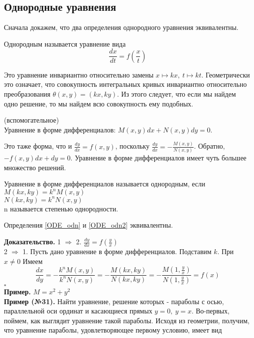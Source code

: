 \subsection{Однородные уравнения}
Сначала докажем, что два определения однородного уравнения эквивалентны.
\begin{defin}
Однородным называется уравнение вида
\begin{equation}%
    \frac{dx}{dt}=f\left(\frac{x}{t}\right) \label{ODE_odn}
\end{equation} 
\end{defin}
Это уравнение инвариантно относительно замены $x\mapsto kx,~t\mapsto kt$.
Геометрически это означает, что совокупность интегральных кривых инвариантно
относительно преобразования $\theta(x,y)=(kx,ky)$.
Из этого следует, что если мы найдем одно решение, то мы найдем всю 
совокупность ему подобных. %
\begin{defin}
    (вспомогательное)\\
Уравнение в форме дифференциалов:
    $M(x,y)dx+N(x,y)dy=0$.  
\end{defin}
Это таже форма, что и $\frac{dy}{dx}=f(x,y)$, поскольку 
$\frac{dy}{dx}=-\frac{M(x,y)}{N(x,y)}$. Обратно, $-f(x,y)dx+dy=0$.
Уравнение в форме дифференциалов имеет чуть большее множество решений. 
\begin{defin}\label{ODE_odn2}
Уравнение в форме дифференциалов называется однородным, если\\
$M(kx,ky)=k^nM(x,y)$\\ 
$N(kx,ky)=k^nN(x,y)$\\
n называется степенью однородности.
\end{defin}
\begin{theor}
    Определения \ref{ODE_odn} и \ref{ODE_odn2} эквивалентны. 
\end{theor}
\textbf{Доказательство.} 1 $\Rightarrow$ 2. $\frac{dy}{dx}=f(\frac{y}{x})$\\
2 $\Rightarrow$ 1. Пусть дано уравнение в форме дифференциалов. Подставим $k$.
При $x\ne 0$ Имеем $$\frac{dx}{dy}=-\frac{k^nM(x,y)}{k^nN(x,y)}=
-\frac{M(kx,ky)}{N(kx,ky)}=-\frac{M(1,\frac{y}{x})}{N(1,\frac{y}{x})}=f(x)$$
$\square$ \\
\textbf{Пример.} $M=x^2+y^2$\\
\textbf{Пример (№31).} Найти уравнение, решение которых - параболы с осью, 
параллельной оси ординат и касающиеся прямых $y=0,~y=x$. 
Во-первых, поймем, как выглядит уравнение такой параболы. Исходя из геометрии,
получим, что уравнение параболы, удовлетворяющее первому условию, имеет вид 
